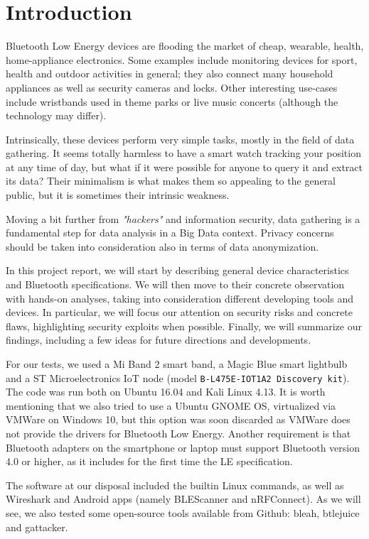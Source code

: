 \chapter{Introduction}
\label{Intro}
\thispagestyle{empty}

\noindent Bluetooth Low Energy devices are flooding the market of cheap, wearable, health, home-appliance electronics. Some examples include monitoring devices for sport, health and outdoor activities in general; they also connect many household appliances as well as security cameras and locks. Other interesting use-cases include wristbands used in theme parks or live music concerts (although the technology may differ).

Intrinsically, these devices perform very simple tasks, mostly in the field of data gathering. It seems totally harmless to have a smart watch tracking your position at any time of day, but what if it were possible for anyone to query it and extract its data? Their minimalism is what makes them so appealing to the general public, but it is sometimes their intrinsic weakness.

Moving a bit further from \textit{"hackers"} and information security, data gathering is a fundamental step for data analysis in a Big Data context. Privacy concerns should be taken into consideration also in terms of data anonymization.

In this project report, we will start by describing general device characteristics and Bluetooth specifications. We will then move to their concrete observation with hands-on analyses, taking into consideration different developing tools and devices. In particular, we will focus our attention on security risks and concrete flaws, highlighting security exploits when possible. Finally, we will summarize our findings, including a few ideas for future directions and developments.

For our tests, we used a Mi Band 2 smart band, a Magic Blue smart lightbulb and a ST Microelectronics IoT node (model \texttt{B-L475E-IOT1A2 Discovery kit}). The code was run both on Ubuntu 16.04 and Kali Linux 4.13. It is worth mentioning that we also tried to use a Ubuntu GNOME OS, virtualized via VMWare on Windows 10, but this option was soon discarded as VMWare does not provide the drivers for Bluetooth Low Energy. Another requirement is that Bluetooth adapters on the smartphone or laptop must support Bluetooth version 4.0 or higher, as it includes for the first time the LE specification.

The software at our disposal included the builtin Linux commands, as well as Wireshark and Android apps (namely BLEScanner and nRFConnect). As we will see, we also tested some open-source tools available from Github: bleah, btlejuice and gattacker.